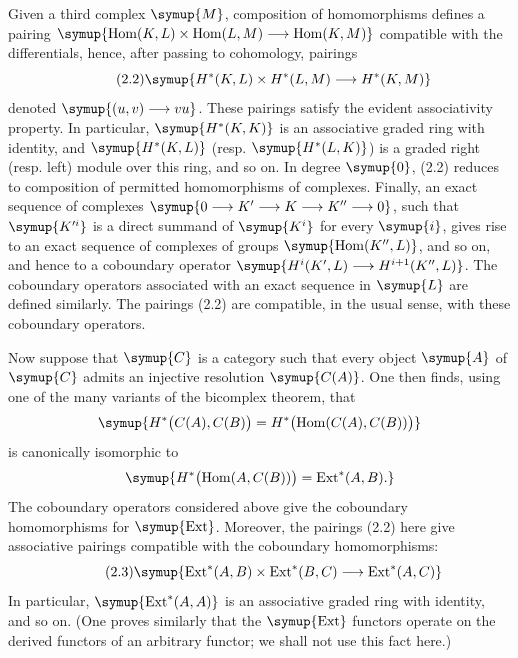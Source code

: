 Given a third complex $\symup{M}$, composition of homomorphisms defines a pairing
$\symup{\operatorname{Hom}(K,L)\times\operatorname{Hom}(L,M)
\longrightarrow\operatorname{Hom}(K,M)}$
compatible with the differentials, hence, after passing to cohomology, pairings
\begin{equation}\tag{2.2}
  \symup{H^{*}(K,L)\times H^{*}(L,M)\longrightarrow H^{*}(K,M)}
\end{equation}
denoted $\symup{(u,v)\longrightarrow vu}$. These pairings satisfy the evident associativity
property. In particular, $\symup{H^{*}(K,K)}$ is an associative graded ring with
identity, and $\symup{H^{*}(K,L)}$ (resp. $\symup{H^{*}(L,K)}$) is a graded right
(resp. left) module over this ring, and so on. In degree $\symup{0}$, (2.2)
reduces to composition of permitted homomorphisms of complexes. Finally, an exact sequence of
complexes
$\symup{0\longrightarrow K'\longrightarrow K\longrightarrow K''\longrightarrow 0}$, such that $\symup{K'^{i}}$ is a direct summand of $\symup{K^{i}}$ for every $\symup{i}$, gives rise to an
exact sequence of complexes of groups $\symup{\operatorname{Hom}(K'',L)}$, and so on,
and hence to a coboundary operator
$\symup{H^{i}(K',L)\longrightarrow H^{i+1}(K'',L)}$.
The coboundary operators associated with an exact sequence in $\symup{L}$ are defined
similarly. The pairings (2.2) are compatible, in the usual sense, with these
coboundary operators.

Now suppose that $\symup{C}$ is a category such that every object $\symup{A}$ of $\symup{C}$ admits an
injective resolution $\symup{C(A)}$. One then finds, using one of the many variants of
the bicomplex theorem, that
\[
  \symup{H^{*}\bigl(C(A),C(B)\bigr)
  =H^{*}\bigl(\operatorname{Hom}(C(A),C(B))\bigr)}
\]
is canonically isomorphic to
\[
  \symup{H^{*}\bigl(\operatorname{Hom}(A,C(B))\bigr)
  =\operatorname{Ext}^{*}(A,B).}
\]
The coboundary operators considered above give the coboundary homomorphisms for
$\symup{\operatorname{Ext}}$. Moreover, the pairings (2.2) here give associative
pairings compatible with the coboundary homomorphisms:
\begin{equation}\tag{2.3}
  \symup{\operatorname{Ext}^{*}(A,B)\times\operatorname{Ext}^{*}(B,C)
  \longrightarrow\operatorname{Ext}^{*}(A,C)}
\end{equation}
In particular, $\symup{\operatorname{Ext}^{*}(A,A)}$ is an associative graded ring with
identity, and so on. (One proves similarly that the $\symup{\operatorname{Ext}}$
functors operate on the derived functors of an arbitrary functor; we shall not
use this fact here.)

